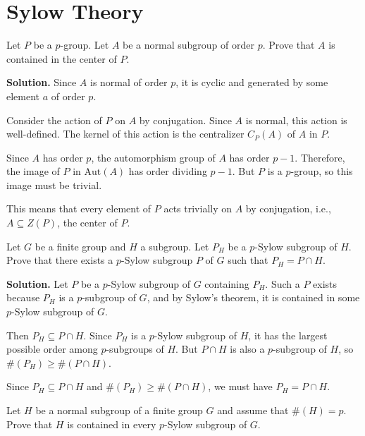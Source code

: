 \section{Sylow Theory}

\begin{problembox}
Let $P$ be a $p$-group. Let $A$ be a normal subgroup of order $p$. Prove that $A$ is contained in the center of $P$.
\end{problembox}

\noindent\textbf{Solution.} Since $A$ is normal of order $p$, it is cyclic and generated by some element $a$ of order $p$. 

Consider the action of $P$ on $A$ by conjugation. Since $A$ is normal, this action is well-defined. The kernel of this action is the centralizer $C_P(A)$ of $A$ in $P$.

Since $A$ has order $p$, the automorphism group of $A$ has order $p-1$. Therefore, the image of $P$ in $\text{Aut}(A)$ has order dividing $p-1$. But $P$ is a $p$-group, so this image must be trivial.

This means that every element of $P$ acts trivially on $A$ by conjugation, i.e., $A \subseteq Z(P)$, the center of $P$.

\begin{problembox}
Let $G$ be a finite group and $H$ a subgroup. Let $P_H$ be a $p$-Sylow subgroup of $H$. Prove that there exists a $p$-Sylow subgroup $P$ of $G$ such that $P_H = P \cap H$.
\end{problembox}

\noindent\textbf{Solution.} Let $P$ be a $p$-Sylow subgroup of $G$ containing $P_H$. Such a $P$ exists because $P_H$ is a $p$-subgroup of $G$, and by Sylow's theorem, it is contained in some $p$-Sylow subgroup of $G$.

Then $P_H \subseteq P \cap H$. Since $P_H$ is a $p$-Sylow subgroup of $H$, it has the largest possible order among $p$-subgroups of $H$. But $P \cap H$ is also a $p$-subgroup of $H$, so $\#(P_H) \geq \#(P \cap H)$.

Since $P_H \subseteq P \cap H$ and $\#(P_H) \geq \#(P \cap H)$, we must have $P_H = P \cap H$.

\begin{problembox}
Let $H$ be a normal subgroup of a finite group $G$ and assume that $\#(H) = p$. Prove that $H$ is contained in every $p$-Sylow subgroup of $G$.
\end{problembox}

